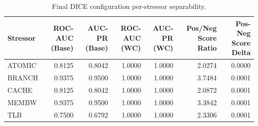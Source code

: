 \begin{table}[t]
\centering
\caption{Final DICE configuration per-stressor separability.}
\label{tab:dice_full_stressor}
\footnotesize
\begin{tabular}{lrrrrrr}
\toprule
Stressor & ROC-AUC (Base) & AUC-PR (Base) & ROC-AUC (WC) & AUC-PR (WC) & Pos/Neg Score Ratio & Pos-Neg Score Delta \\
\midrule
ATOMIC & 0.8125 & 0.8042 & 1.0000 & 1.0000 & 2.0274 & 0.0000 \\
BRANCH & 0.9375 & 0.9500 & 1.0000 & 1.0000 & 3.7484 & 0.0001 \\
CACHE & 0.8125 & 0.8042 & 1.0000 & 1.0000 & 2.0872 & 0.0001 \\
MEMBW & 0.9375 & 0.9500 & 1.0000 & 1.0000 & 3.3842 & 0.0001 \\
TLB & 0.7500 & 0.6792 & 1.0000 & 1.0000 & 2.3306 & 0.0001 \\
\bottomrule
\end{tabular}

\end{table}
